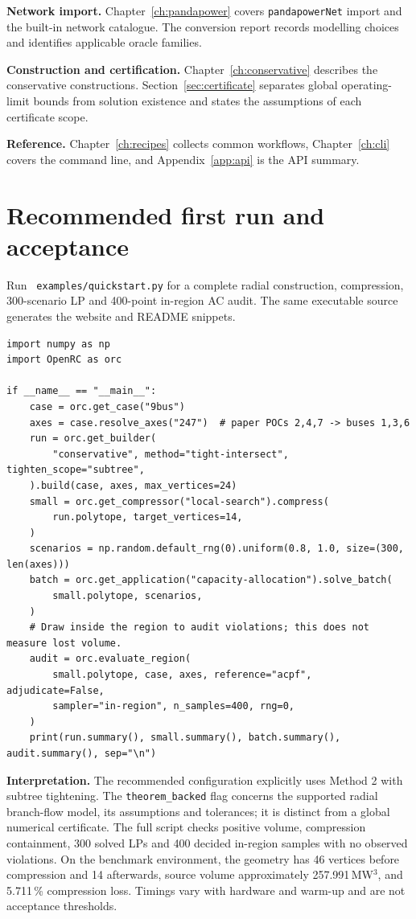 \documentclass[11pt,a4paper]{report}
\newcommand{\code}[1]{\texttt{\small #1}}
\newcommand{\file}[1]{\texttt{\small\color{nbgrey} #1}}
\begin{document}
\medskip
\noindent
\textbf{Network import.} Chapter~\ref{ch:pandapower} covers
\code{pandapowerNet} import and the built-in network catalogue. The conversion
report records modelling choices and identifies applicable oracle families.

\medskip
\noindent
\textbf{Construction and certification.} Chapter~\ref{ch:conservative}
describes the conservative constructions. Section~\ref{sec:certificate}
separates global operating-limit bounds from solution existence and states the
assumptions of each certificate scope.

\medskip
\noindent
\textbf{Reference.} Chapter~\ref{ch:recipes} collects common workflows,
Chapter~\ref{ch:cli} covers the command line, and
Appendix~\ref{app:api} is the API summary.


\section*{Recommended first run and acceptance}

Run \file{examples/quickstart.py} for a complete radial construction,
compression, 300-scenario LP and 400-point in-region AC audit. The same
executable source generates the website and README snippets.

\begin{lstlisting}
import numpy as np
import OpenRC as orc

if __name__ == "__main__":
    case = orc.get_case("9bus")
    axes = case.resolve_axes("247")  # paper POCs 2,4,7 -> buses 1,3,6
    run = orc.get_builder(
        "conservative", method="tight-intersect", tighten_scope="subtree",
    ).build(case, axes, max_vertices=24)
    small = orc.get_compressor("local-search").compress(
        run.polytope, target_vertices=14,
    )
    scenarios = np.random.default_rng(0).uniform(0.8, 1.0, size=(300, len(axes)))
    batch = orc.get_application("capacity-allocation").solve_batch(
        small.polytope, scenarios,
    )
    # Draw inside the region to audit violations; this does not measure lost volume.
    audit = orc.evaluate_region(
        small.polytope, case, axes, reference="acpf", adjudicate=False,
        sampler="in-region", n_samples=400, rng=0,
    )
    print(run.summary(), small.summary(), batch.summary(), audit.summary(), sep="\n")
\end{lstlisting}

\noindent\textbf{Interpretation.} The recommended configuration explicitly uses
Method 2 with subtree tightening. The \code{theorem\_backed} flag concerns
the supported radial branch-flow model, its assumptions and tolerances;
it is distinct from a global numerical certificate. The full script checks
positive volume, compression containment, 300 solved LPs and 400 decided
in-region samples with no observed violations. On the benchmark environment,
the geometry has 46 vertices before compression and 14 afterwards, source
volume approximately 257.991\,MW$^3$, and 5.711\,\% compression loss.
Timings vary with hardware and warm-up and are not acceptance thresholds.
\end{document}
